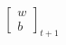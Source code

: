 \documentclass[preview]{standalone}
\begin{document}
\begin{align*}
\begin{bmatrix} w \\ b \end{bmatrix}_{t+1}
\end{align*}
\end{document}
